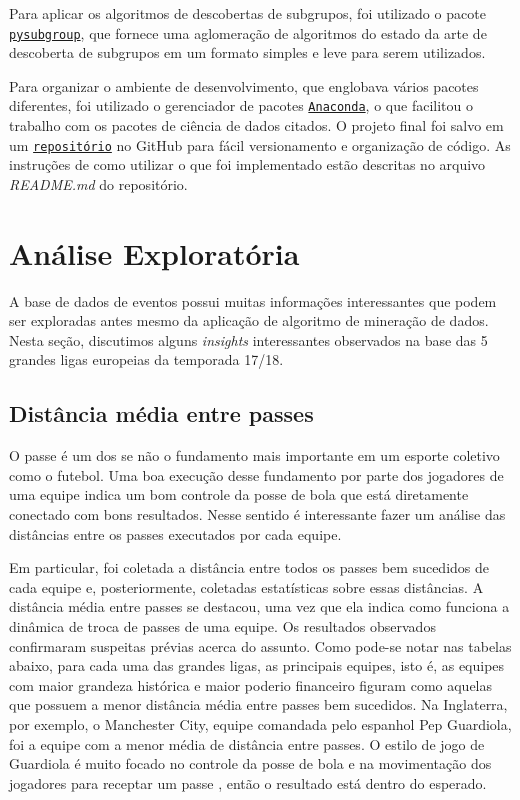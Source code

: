 \documentclass{article}
\begin{document}
Para aplicar os algoritmos de descobertas de subgrupos, foi utilizado o pacote
\href{https://pysubgroup.readthedocs.io/en/latest/}{\texttt{pysubgroup}}, que
fornece uma aglomeração de algoritmos do estado da arte de descoberta de
subgrupos em um formato simples e leve para serem utilizados.


Para organizar o ambiente de desenvolvimento, que englobava vários pacotes
diferentes, foi utilizado o gerenciador de pacotes
\href{https://www.anaconda.com/}{\texttt{Anaconda}}, o que facilitou o trabalho
com os pacotes de ciência de dados citados. O projeto final foi salvo em um
\href{https://github.com/lframosferreira/projeto-ad}{\texttt{repositório}}
no GitHub para fácil versionamento e organização de código. As instruções de
como
utilizar o que foi implementado estão descritas no arquivo \textit{README.md}
do repositório.

\section{Análise Exploratória}

A base de dados de eventos possui muitas informações interessantes que podem
ser exploradas antes mesmo da aplicação
de algoritmo de mineração de dados. Nesta seção, discutimos alguns
\textit{insights} interessantes observados na base das 5 grandes ligas
europeias da temporada 17/18.

\subsection{Distância média entre passes}

O passe é um dos se não o fundamento mais importante em um esporte coletivo
como o futebol. Uma boa execução desse fundamento por parte dos jogadores
de uma equipe indica um bom controle da posse de bola que está diretamente
conectado com bons resultados. Nesse sentido é interessante fazer um análise
das distâncias entre os passes
executados por cada equipe.

Em particular, foi coletada a distância entre todos os passes bem sucedidos de
cada equipe e, posteriormente, coletadas estatísticas sobre essas distâncias. A
distância média
entre passes se destacou, uma vez que ela indica como funciona a dinâmica de
troca de passes de uma equipe. Os resultados observados confirmaram suspeitas
prévias acerca do assunto.
Como pode-se notar nas tabelas abaixo, para cada uma das grandes ligas, as
principais equipes, isto é, as equipes com maior grandeza histórica e maior
poderio financeiro figuram como aquelas
que possuem a menor distância média entre passes bem sucedidos. Na Inglaterra,
por exemplo, o Manchester City, equipe comandada pelo espanhol Pep Guardiola,
foi a equipe com a menor média
de distância entre passes. O estilo de jogo de Guardiola é muito focado no
controle da posse de bola e na movimentação dos jogadores para receptar um
passe \cite{terzis2023pep}, então o resultado está dentro do
esperado.
\end{document}
